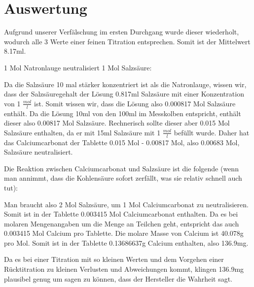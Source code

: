 \documentclass[8pt, letterpaper]{article}
\newcommand{\mpl}[1]{#1 \(\frac{mol}{l}\)}
\begin{document}
\section{Auswertung}
Aufgrund unserer Verfälschung im ersten Durchgang wurde dieser wiederholt, wodurch alle 3 Werte einer feinen Titration entsprechen.
Somit ist der Mittelwert 8.17ml.

1 Mol Natronlauge neutralisiert 1 Mol Salzsäure:
\begin{center}
\end{center}

Da die Salzsäure 10 mal stärker konzentriert ist als die Natronlauge, wissen wir, dass der Salzsäuregehalt der Lösung 0.817ml Salzsäure mit einer Konzentration von \mpl{1} ist.
Somit wissen wir, dass die Lösung also 0.000817 Mol Salzsäure enthält. Da die Lösung 10ml von den 100ml im Messkolben entspricht, enthält dieser also 0.00817 Mol Salzsäure.
Rechnerisch sollte dieser aber 0.015 Mol Salzsäure enthalten, da er mit 15ml Salzsäure mit \mpl{1} befüllt wurde. Daher hat das Calciumcarbonat der Tablette 0.015 Mol - 0.00817 Mol, also 0.00683 Mol, Salzsäure neutralisiert.

Die Reaktion zwischen Calciumcarbonat und Salzsäure ist die folgende (wenn man annimmt, dass die Kohlensäure sofort zerfällt, was sie relativ schnell auch tut):
\begin{center}
\end{center}

Man braucht also 2 Mol Salzsäure, um 1 Mol Calciumcarbonat zu neutralisieren. Somit ist in der Tablette 0.003415 Mol Calciumcarbonat enthalten.
Da es bei molaren Mengenangaben um die Menge an Teilchen geht, entspricht das auch 0.003415 Mol Calcium pro Tablette.
Die molare Masse von Calcium ist 40.078g pro Mol.
Somit ist in der Tablette 0.13686637g Calcium enthalten, also 136.9mg.

Da es bei einer Titration mit so kleinen Werten und dem Vorgehen einer Rücktitration zu kleinen Verlusten und Abweichungen kommt, klingen 136.9mg plausibel genug um sagen zu können, dass der Hersteller die Wahrheit sagt.
\end{document}
